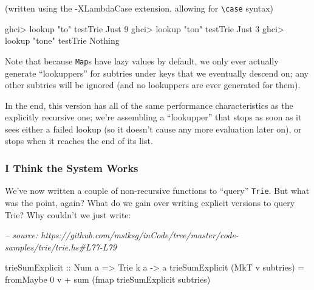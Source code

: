 \documentclass[]{article}
\newenvironment{Shaded}{}{}
\newcommand{\CommentTok}[1]{\textcolor[rgb]{0.38,0.63,0.69}{\textit{#1}}}
\newcommand{\DataTypeTok}[1]{\textcolor[rgb]{0.56,0.13,0.00}{#1}}
\newcommand{\DecValTok}[1]{\textcolor[rgb]{0.25,0.63,0.44}{#1}}
\newcommand{\FunctionTok}[1]{\textcolor[rgb]{0.02,0.16,0.49}{#1}}
\newcommand{\NormalTok}[1]{#1}
\newcommand{\OtherTok}[1]{\textcolor[rgb]{0.00,0.44,0.13}{#1}}
\newcommand{\StringTok}[1]{\textcolor[rgb]{0.25,0.44,0.63}{#1}}
\begin{document}
(written using the -XLambdaCase extension, allowing for
\texttt{\textbackslash{}case} syntax)

\begin{Shaded}
\begin{Highlighting}[]
\NormalTok{ghci}\FunctionTok{>}\NormalTok{ lookup }\StringTok{"to"}\NormalTok{ testTrie}
\DataTypeTok{Just} \DecValTok{9}
\NormalTok{ghci}\FunctionTok{>}\NormalTok{ lookup }\StringTok{"ton"}\NormalTok{ testTrie}
\DataTypeTok{Just} \DecValTok{3}
\NormalTok{ghci}\FunctionTok{>}\NormalTok{ lookup }\StringTok{"tone"}\NormalTok{ testTrie}
\DataTypeTok{Nothing}
\end{Highlighting}
\end{Shaded}

Note that because \texttt{Map}s have lazy values by default, we only ever
actually generate ``lookuppers'' for subtries under keys that we eventually
descend on; any other subtries will be ignored (and no lookuppers are ever
generated for them).

In the end, this version has all of the same performance characteristics as the
explicitly recursive one; we're assembling a ``lookupper'' that stops as soon as
it sees either a failed lookup (so it doesn't cause any more evaluation later
on), or stops when it reaches the end of its list.

\hypertarget{i-think-the-system-works}{%
\subsubsection{I Think the System Works}\label{i-think-the-system-works}}

We've now written a couple of non-recursive functions to ``query''
\texttt{Trie}. But what was the point, again? What do we gain over writing
explicit versions to query Trie? Why couldn't we just write:

\begin{Shaded}
\begin{Highlighting}[]
\CommentTok{-- source: https://github.com/mstksg/inCode/tree/master/code-samples/trie/trie.hs#L77-L79}

\OtherTok{trieSumExplicit ::} \DataTypeTok{Num}\NormalTok{ a }\OtherTok{=>} \DataTypeTok{Trie}\NormalTok{ k a }\OtherTok{->}\NormalTok{ a}
\NormalTok{trieSumExplicit (}\DataTypeTok{MkT}\NormalTok{ v subtries) }\FunctionTok{=}
\NormalTok{    fromMaybe }\DecValTok{0}\NormalTok{ v }\FunctionTok{+}\NormalTok{ sum (fmap trieSumExplicit subtries)}
\end{Highlighting}
\end{Shaded}
\end{document}
